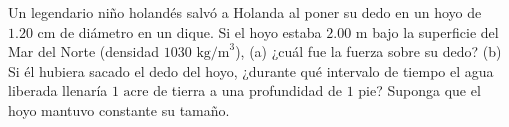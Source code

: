 \item Un legendario niño holandés salvó a Holanda al poner su dedo en un hoyo de $1.20 \text{ cm}$ de diámetro en un dique. Si el hoyo estaba $2.00 \text{ m}$ bajo la superficie del Mar del Norte (densidad $1030 \text{ kg/m}^3$), (a) ¿cuál fue la fuerza sobre su dedo? (b) Si él hubiera sacado el dedo del hoyo, ¿durante qué intervalo de tiempo el agua liberada llenaría $1 \text{ acre}$ de tierra a una profundidad de $1 \text{ pie}$? Suponga que el hoyo mantuvo constante su tamaño.
